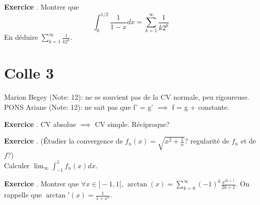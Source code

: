 \documentclass[10pt,a4paper]{article}
\newcounter{question}
\newcounter{exo}
\newenvironment{exo}{\vspace{0.5cm}\setcounter{question}{0}\addtocounter{exo}{1} \noindent \textbf{Exercice \theexo}. \normalsize }{\par}
\begin{document}
	\begin{exo}
		Montrer que $$\int_{0}^{1/2}\frac{1}{1-x} dx = \sum_{k=1}^{\infty} \frac{1}{k 2^k}$$
		En déduire $\sum_{k=1}^{\infty} \frac{1}{k 2^k}$.
	\end{exo}

	\section*{Colle 3}
	\setcounter{exo}{0}
	Marion Begey (Note: 12): ne se souvient pas de la CV normale, peu rigoureuse. \\
	PONS Ariane (Note: 12): ne sait pas que f' = g' $\implies$ f = g + constante. \\  
	
	\begin{exo}
		CV absolue $\implies$ CV simple. Réciproque?
	\end{exo}

	\begin{exo}
		(Étudier la convergence de $f_n(x) = \sqrt{x^2 + \frac{1}{n}}$? regularité de $f_n$ et de $f$?)\\
		Calculer $\lim_\infty \int_{-1}^{1} f_n(x) dx$.	
	\end{exo}
	
	\begin{exo}
		Montrer que $\forall x \in ]-1, 1[$, $\arctan(x) = \sum_{k=0}^{\infty} (-1)^k \frac{x^{2k + 1}}{2k + 1}$. On rappelle que $\arctan'(x) = \frac{1}{1+x^2}$.
	\end{exo}
	
\end{document}
